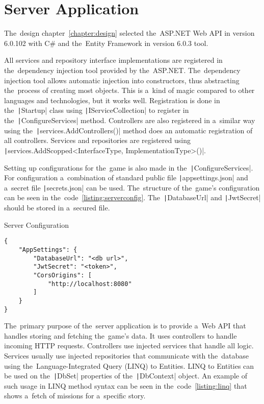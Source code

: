 \section{Server Application}

The~design chapter~\ref{chapter:design} selected the~ASP.NET Web API in version 6.0.102 with C\# and the~Entity Framework in version 6.0.3 tool.

All services and repository interface implementations are registered in the~dependency injection tool provided by the~ASP.NET.
The~dependency injection tool allows automatic injection into constructors, thus abstracting the~process of creating most objects.
This is a~kind of magic compared to other languages and technologies, but it works well.
Registration is done in the~\texttt|Startup| class using \texttt|IServiceCollection| to register in the~\texttt|ConfigureServices| method.
Controllers are also registered in a~similar way using the~\texttt|services.AddControllers()| method does an automatic registration of all controllers.
Services and repositories are registered using \texttt|services.AddScopped<InterfaceType, ImplementationType>()|.

Setting up configurations for the~game is also made in the~\texttt|ConfigureServices|.
For configuration a~combination of standard public file \texttt|appsettings.json| and a~secret file \texttt|secrets.json| can be used.
The~structure of the~game's configuration can be seen in the~code~\ref{listing:serverconfig}.
The~\texttt|DatabaseUrl| and \texttt|JwtSecret| should be stored in a~secured file.

\begin{listing}
    \caption{Server Configuration}
    \label{listing:serverconfig}
    \begin{verbatim}
{
    "AppSettings": {
        "DatabaseUrl": "<db url>",
        "JwtSecret": "<token>",
        "CorsOrigins": [
            "http://localhost:8080"
        ]
    }
}
    \end{verbatim}
\end{listing}

The~primary purpose of the~server application is to provide a~Web API that handles storing and fetching the~game's data.
It uses controllers to handle incoming HTTP requests.
Controllers use injected services that handle all logic.
Services usually use injected repositories that communicate with the~database using the~Language-Integrated Query (LINQ) to Entities.
LINQ to Entities can be used on the~\texttt|DbSet| properties of the~\texttt|DbContext| object.
An example of such usage in LINQ method syntax can be seen in the~code~\ref{listing:linq} that shows a~fetch of missions for a~specific story.

